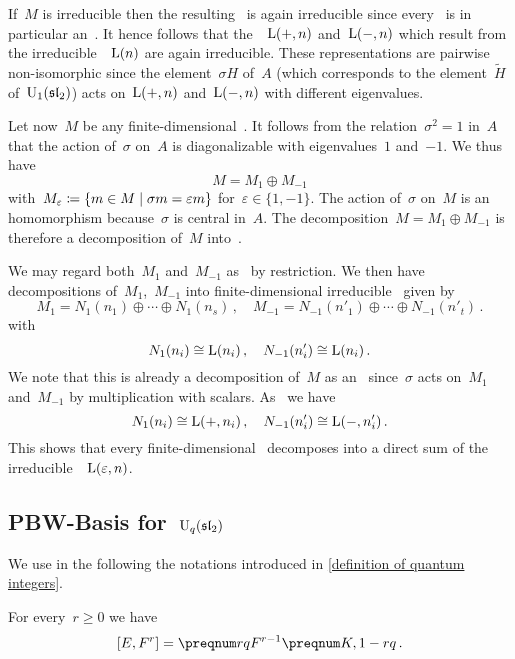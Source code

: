 \documentclass[a4paper, 11pt, oneside]{scrartcl}
\begin{document}
If~$M$ is irreducible then the resulting~ is again irreducible since every~ is in particular an~.
It hence follows that the~~$\operatorname{L}(+,n)$ and~$\operatorname{L}(-,n)$ which result from the irreducible~~$\operatorname{L}(n)$ are again irreducible.
These representations are pairwise non-isomorphic since the element~$\sigma H$ of~$A$ (which corresponds to the element~$\widetilde{H}$ of~$\operatorname{U}_1(\mathfrak{sl}_2)$) acts on~$\operatorname{L}(+,n)$ and~$\operatorname{L}(-,n)$ with different eigenvalues.

Let now~$M$ be any finite-dimensional~.
It follows from the relation~$\sigma^2 = 1$ in~$A$ that the action of~$\sigma$ on~$A$ is diagonalizable with eigenvalues~$1$ and~$-1$.
We thus have
\[
  M = M_{1} \oplus M_{-1}
\]
with~$M_\varepsilon \defined \{ m \in M \suchthat \sigma m = \varepsilon m \}$ for~$\varepsilon \in \{ 1, -1 \}$.
The action of~$\sigma$ on~$M$ is an~ homomorphism because~$\sigma$ is central in~$A$.
The decomposition~$M = M_{1} \oplus M_{-1}$ is therefore a decomposition of~$M$ into~.

We may regard both~$M_1$ and~$M_{-1}$ as~ by restriction.
We then have decompositions of~$M_1$,~$M_{-1}$ into finite-dimensional irreducible~ given by
\[
  M_1
  =
  N_1(n_1) \oplus \dotsb \oplus N_1(n_s) \,,
  \quad
  M_{-1}
  =
  N_{-1}(n'_1) \oplus \dotsb \oplus N_{-1}(n'_t) \,.
\]
with
\[
  N_1(n_i) \cong \operatorname{L}(n_i) \,,
  \quad
  N_{-1}(n'_i) \cong \operatorname{L}(n_i) \,.
\]
We note that this is already a decomposition of~$M$ as an~ since~$\sigma$ acts on~$M_1$ and~$M_{-1}$ by multiplication with scalars.
As~ we have
\[
  N_1(n_i) \cong \operatorname{L}(+, n_i) \,,
  \quad
  N_{-1}(n'_i) \cong \operatorname{L}(-, n'_i) \,.
\]
This shows that every finite-dimensional~ decomposes into a direct sum of the irreducible~~$\operatorname{L}(\varepsilon, n)$.




\subsection{PBW-Basis for~\texorpdfstring{$\operatorname{U}_q(\mathfrak{sl}_2)$}{Uq(sl2)}}
\label{proof of quantum pbw}

We use in the following the notations introduced in \cref{definition of quantum integers}.

\begin{lemma}
  \label{generalized commutator relation for E and F}
  For every~$r \geq 0$ we have
  \[
    [E, F^r]
    =
    \qnum{r} F^{r-1} \qnum{K, 1-r} \,.
  \]
\end{lemma}
\end{document}
